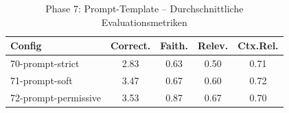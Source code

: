 \begin{table}[H]
\centering
\small
\begin{tabular}{lcccc}
\toprule
Config & Correct. & Faith. & Relev. & Ctx.Rel. \\
\midrule
70-prompt-strict & 2.83 & 0.63 & 0.50 & 0.71 \\
71-prompt-soft & 3.47 & 0.67 & 0.60 & 0.72 \\
72-prompt-permissive & 3.53 & 0.87 & 0.67 & 0.70 \\
\bottomrule
\end{tabular}
\caption{Phase 7: Prompt-Template -- Durchschnittliche Evaluationsmetriken}
\label{tab:phase7_eval}
\end{table}